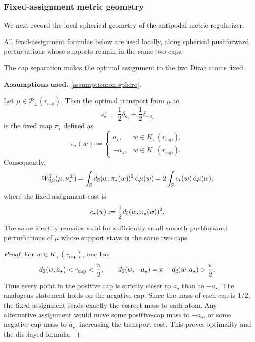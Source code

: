 \subsubsection{Fixed-assignment metric geometry}

We next record the local spherical geometry of the antipodal metric
regularizer.

All fixed-assignment formulas below are used locally, along spherical pushforward perturbations whose supports remain in the same two caps.

The cap separation makes the optimal assignment to the two Dirac atoms fixed.
\begin{lemma}
\label{lemma-fixed-assignment}
\textbf{Assumptions used.} \cref{assumption:on-sphere}.

Let \(\mu\in\mathcal P_\pm(r_{\mathrm{cap}})\).  Then the optimal transport from \(\mu\) to
\[
    \nu_\star^\pm=\frac12\delta_{a_\star}+\frac12\delta_{-a_\star}
\]
is the fixed map \(\pi_\star\)                                                               
defined as
\begin{equation}
\label{eq:mf-assigned-pole}
    \pi_\star(w)
    \coloneq
    \begin{cases}
        a_\star, & w\in K_+(r_{\mathrm{cap}}),\\
        -a_\star, & w\in K_-(r_{\mathrm{cap}}),
    \end{cases}
\end{equation}
Consequently,
\begin{equation}
\label{eq:fixed-assignment-W2-square-formula}
    W_{2,\mathbb{S}}^2(\mu,\nu_\star^\pm)
    =
    \int_{\mathbb{S}} d_{\mathbb{S}}(w,\pi_\star(w))^2\,\dd\mu(w)
    =
    2\int_{\mathbb{S}}c_\star(w)\,\dd\mu(w),
\end{equation}
where the fixed-assignment cost is
\begin{equation}
\label{eq:mf-fixed-assignment-cost}
c_\star(w):=\frac12 d_{\mathbb{S}}(w,\pi_\star(w))^2.
\end{equation}
The same identity remains valid for sufficiently small smooth pushforward perturbations of \(\mu\) whose support stays in the same two caps.
\end{lemma}

\begin{proof}
For \(w\in K_+(r_{\mathrm{cap}})\), one has
\[
    d_{\mathbb{S}}(w,a_\star)<r_{\mathrm{cap}}<\frac\pi2,
    \qquad
    d_{\mathbb{S}}(w,-a_\star)=\pi-d_{\mathbb{S}}(w,a_\star)>\frac\pi2.
\]
Thus every point in the positive cap is strictly closer to \(a_\star\) than to \(-a_\star\).  The analogous statement holds on the negative cap.  Since the mass of each cap is \(1/2\), the fixed assignment sends exactly the correct mass to each atom.  Any alternative assignment would move some positive-cap mass to \(-a_\star\), or some negative-cap mass to \(a_\star\), increasing the transport cost.  This proves optimality and the displayed formula.
\end{proof}

